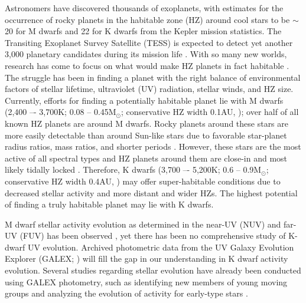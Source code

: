 \documentclass[preprint2]{aastex62}
\begin{document}
Astronomers have discovered thousands of exoplanets, with estimates for the occurrence of rocky planets in the habitable zone (HZ) around cool stars to be $\sim$20 for M dwarfs \citep{Dressing2015} and 22 for K dwarfs \citep{Petigura2013} from the Kepler mission statistics. The Transiting Exoplanet Survey Satellite (TESS) is expected to detect yet another 3,000 planetary candidates during its mission life \citep{Ricker2009, Ricker2014}. With so many new worlds, research has come to focus on what would make HZ planets in fact habitable \citep[e.g.][]{Cockell2016, Kaltenegger2017}. The struggle has been in finding a planet with the right balance of environmental factors of stellar lifetime, ultraviolet (UV) radiation, stellar winds, and HZ size. Currently, efforts for finding a potentially habitable planet lie with M dwarfs (2,400 –- 3,700K; 0.08 -- 0.45M$_{\odot}$; conservative HZ width 0.1AU, \citealt{Kopparapu2013}); over half of all known HZ planets are around M dwarfs. Rocky planets around these stars are more easily detectable than around Sun-like stars due to favorable star-planet radius ratios, mass ratios, and shorter periods \citep{Charbonneau2007}. However, these stars are the most active of all spectral types and HZ planets around them are close-in and most likely tidally locked \citep[e.g.][]{Checlair2017, Barnes2017}. Therefore, K dwarfs (3,700 –- 5,200K; 0.6 -- 0.9M$_{\odot}$; conservative HZ width 0.4AU, \citealt{Kopparapu2013}) may offer super-habitable conditions due to decreased stellar activity and more distant and wider HZs. The highest potential of finding a truly habitable planet may lie with K dwarfs.

M dwarf stellar activity evolution as determined in the near-UV (NUV) and far-UV (FUV) has been observed \citep{Shkolnik2014, Schneider2018}, yet there has been no comprehensive study of K-dwarf UV evolution. Archived photometric data from the UV Galaxy Evolution Explorer (GALEX; \citealt{Martin2004}) will fill the gap in our understanding in K dwarf activity evolution. Several studies regarding stellar evolution have already been conducted using GALEX photometry, such as identifying new members of young moving groups \citep{Shkolnik2010, Rodriguez2010, Rodriguez2013} and analyzing the evolution of activity for early-type stars \citep{Findeisen2011}.

\end{document}
